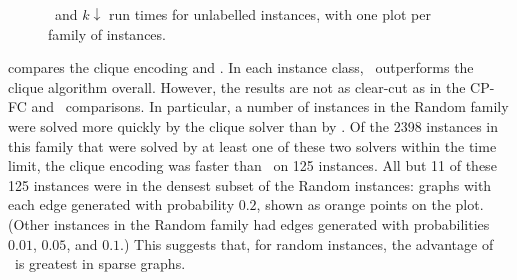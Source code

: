 \begin{figure}[htb]
{        \label{figure:mcsplain-runtime-mcsplitdown-kdown-bv}
    }
    \caption{\McSplitDown\ and $k\downarrow$ run times for unlabelled instances, with one plot per family of instances.}
    \label{figure:mcsplain-runtime-mcsplitdown-kdown-scatters}
\end{figure}



 compares the clique encoding and \McSplitDown.
In each instance class, \McSplitDown\ outperforms the clique algorithm overall.  However, the results are
not as clear-cut as in the CP-FC and \kDown\ comparisons.  In particular, a number of instances
in the Random family were solved more quickly by the clique solver than by \McSplitDown.  Of the 2398
instances in this family that were solved by at least one of these two solvers within the time limit,
the clique encoding was faster than \McSplitDown\ on 125 instances.  All but 11 of these 125 instances
were in the densest subset of the Random instances: graphs with each edge generated with probability $0.2$,
shown as orange points on the plot.
(Other instances in the Random family had edges generated with probabilities $0.01$, $0.05$, and $0.1$.)
This suggests that, for random instances, the advantage of \McSplitDown\ is greatest in sparse graphs.

